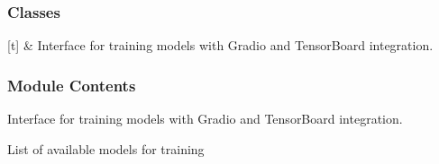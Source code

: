 \documentclass[letterpaper,10pt,english]{sphinxmanual}
\begin{document}
\subsubsection{Classes}
\label{\detokenize{autoapi/src/Interface/index:classes}}

\begin{savenotes}\sphinxattablestart
\sphinxthistablewithglobalstyle
\sphinxthistablewithnovlinesstyle
\centering
\begin{tabulary}{\linewidth}[t]{}
\sphinxtoprule
\sphinxtableatstartofbodyhook
\sphinxAtStartPar
{\hyperref[\detokenize{autoapi/src/Interface/index:src.Interface.Interface}]{}}
&
\sphinxAtStartPar
Interface for training models with Gradio and TensorBoard integration.
\\
\sphinxbottomrule
\end{tabulary}
\sphinxtableafterendhook\par
\sphinxattableend\end{savenotes}


\subsubsection{Module Contents}
\label{\detokenize{autoapi/src/Interface/index:module-contents}}

\begin{fulllineitems}
\label{\detokenize{autoapi/src/Interface/index:src.Interface.Interface}}
\pysigstartsignatures
\pysigline
{}
\pysigstopsignatures
\end{fulllineitems}


\sphinxAtStartPar
Interface for training models with Gradio and TensorBoard integration.

\begin{fulllineitems}
\label{\detokenize{autoapi/src/Interface/index:src.Interface.log_path}}
\pysigstartsignatures
\pysigline
{}
\pysigstopsignatures
\sphinxAtStartPar
List of available models for training

\end{fulllineitems}
\end{document}
